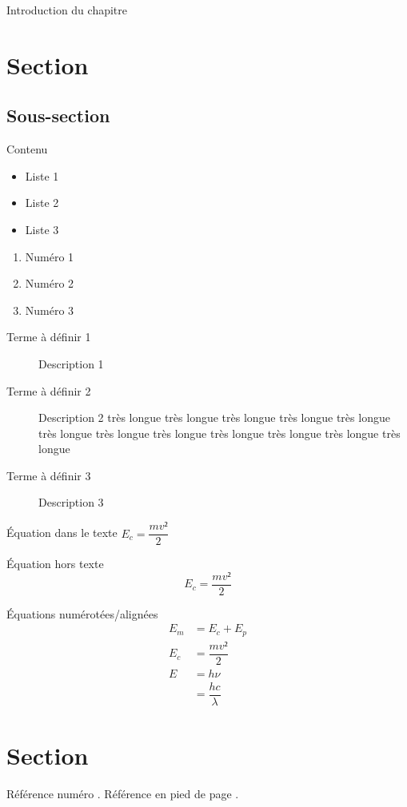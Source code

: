 \begin{chapitre}

	Introduction du chapitre
		
		\section{Section}
		
			\subsection{Sous-section}
		
				Contenu
				
				\begin{itemize}
					\item Liste 1
					\item Liste 2
					\item Liste 3
				\end{itemize}
				
				\begin{enumerate}
					\item Numéro 1
					\item Numéro 2
					\item Numéro 3
				\end{enumerate}
				
				\begin{description}
					\item[Terme à définir 1] Description 1
					\item[Terme à définir 2] Description 2 très longue très longue très longue très longue très longue très longue très longue très longue très longue très longue très longue très longue
					\item[Terme à définir 3] Description 3
				\end{description}
				
				Équation dans le texte $E_c=\dfrac{m v²}{2}$
				
				Équation hors texte
				\[E_c=\dfrac{m v²}{2}\]
				
				Équations numérotées/alignées
				\begin{align}
					E_m 	&= E_c + E_p\\
					E_c 		&=\dfrac{m v²}{2}\\
					E 			&= h \nu\\
								&= \dfrac{h c}{\lambda}
				\end{align}
				
	\section{Section}
	
	Référence numéro \cite{mcmaster}. Référence en pied de page .
	
\end{chapitre}